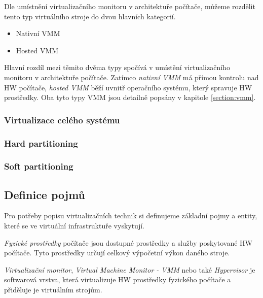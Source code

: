     Dle umístnění virtualizačního monitoru v architektuře počítače, můžeme rozdělit tento typ virtuálního stroje do dvou hlavních kategorií. 
    
    \begin{itemize}
     \item Nativní VMM
     \item Hosted VMM
    \end{itemize}

    Hlavní rozdíl mezi těmito dvěma typy spočívá v umístění virtualizačního monitoru v architektuře počítače. Zatímco \textit{nativní VMM} má přímou kontrolu nad HW počítače, \textit{hosted VMM} běží uvnitř operačního systému,
    který spravuje HW prostředky. Oba tyto typy VMM jsou detailně popsány v kapitole \ref{section:vmm}.
    
    \subsubsection*{Virtualizace celého systému}
    \label{subsubsection:whole_system_virtualization}
    
    
    
    \subsubsection*{Hard partitioning}
    \label{subsubsection:hard_partitioning}
    
    
    
    \subsubsection*{Soft partitioning}
    \label{subsubsection:soft_partitioning}
    
  
  
  \subsection{Definice pojmů}
  \label{definitions}

  Pro potřeby popisu virtualizačních technik si definujeme základní pojmy a entity, které se ve virtuální infrastruktuře vyskytují.

  \textit{Fyzické prostředky} počítače jsou dostupné prostředky a služby poskytované HW počítače. Tyto prostředky určují celkový výpočetní výkon daného stroje.

  \textit{Virtualizační monitor}, \textit{Virtual Machine Monitor - VMM} nebo také \textit{Hypervisor} je softwarová vrstva, která virtualizuje HW prostředky fyzického počítače a přiděluje je
  virtuálním strojům.

